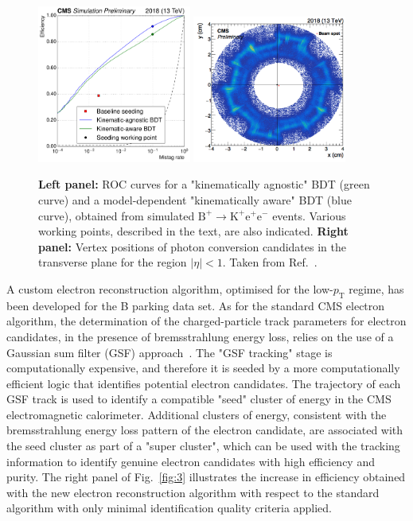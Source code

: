 \documentclass{webofc}
\newcommand{\ee}{\ensuremath{\textrm{e}^+\textrm{e}^-}\xspace}
\newcommand{\btok}{\ensuremath{\textrm{B}^+{\rightarrow}\textrm{K}^+}\xspace}
\newcommand{\btokee}{\ensuremath{\btok\ee}\xspace}
\newcommand{\pt}{\ensuremath{p_\textrm{T}}\xspace}
\begin{document}
\begin{figure}[!t]
  \centering
  \includegraphics[width=0.45\textwidth,height=0.44\textwidth]{CMS-DP-2019-XXX_S13}
  \includegraphics[width=0.45\textwidth]{CMS-DP-2019-XXX_S16_small}
  \caption{\textbf{Left panel:} ROC curves for a "kinematically
    agnostic" BDT (green curve) and a model-dependent "kinematically
    aware" BDT (blue curve), obtained from simulated \btokee events.
    Various working points, described in the text, are also indicated.
    \textbf{Right panel:} Vertex positions of photon conversion
    candidates in the transverse plane for the region $|\eta| < 1$.
    Taken from Ref.~\cite{bpark-dps}.} 
  \label{fig:4}
\end{figure}

A custom electron reconstruction algorithm, optimised for the low-\pt
regime, has been developed for the B parking data set. As for the
standard CMS electron algorithm, the determination of the
charged-particle track parameters for electron candidates, in the
presence of bremsstrahlung energy loss, relies on the use of a
Gaussian sum filter (GSF) approach~\cite{}. The "GSF tracking" stage
is computationally expensive, and therefore it is seeded by a more
computationally efficient logic that identifies potential electron
candidates. The trajectory of each GSF track is used to identify a
compatible "seed" cluster of energy in the CMS electromagnetic
calorimeter. Additional clusters of energy, consistent with the
bremsstrahlung energy loss pattern of the electron candidate, are
associated with the seed cluster as part of a "super cluster", which
can be used with the tracking information to identify genuine electron
candidates with high efficiency and purity. The right panel of
Fig.~\ref{fig:3} illustrates the increase in efficiency obtained with
the new electron reconstruction algorithm with respect to the
standard algorithm with only minimal identification quality criteria
applied.
\end{document}
